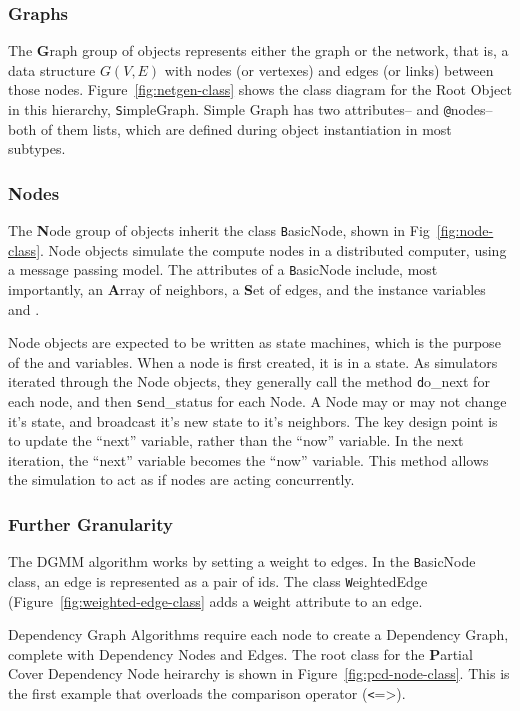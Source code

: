 \subsubsection{Graphs}

The {\textbf Graph} group of objects represents either the graph or the network, that is, a data structure $G(V,E)$ with nodes (or vertexes) and edges (or links) between those nodes. Figure~\ref{fig:netgen-class} shows the class diagram for the Root Object in this hierarchy, {\texttt SimpleGraph}. Simple Graph has two attributes--{\texttt \@edges} and {\texttt @nodes}--both of them lists, which are defined during object instantiation in most subtypes. 


\subsubsection{Nodes}
\label{sec:sim-objects-nodes}
The {\textbf Node} group of objects inherit the class {\texttt BasicNode}, shown in Fig~\ref{fig:node-class}. Node objects simulate the compute nodes in a distributed computer, using a message passing model. The attributes of a {\texttt BasicNode} include, most importantly, an {\textbf Array} of neighbors, a {\textbf Set} of edges, and the instance variables {\@next and \@now}.

Node objects are expected to be written as state machines, which is the purpose of the \@next and \@now variables. When a node is first created, it is in a state. As simulators iterated through the Node objects, they generally call the method {\texttt do\_next} for each node, and then {\texttt send\_status} for each Node. A Node may or may not change it's state, and broadcast it's new state to it's neighbors. The key design point is to update the ``next'' variable, rather than the ``now'' variable. In the next iteration, the ``next'' variable becomes the ``now'' variable. This method allows the simulation to act as if nodes are acting concurrently.

\subsubsection{Further Granularity}

The DGMM algorithm works by setting a weight to edges. In the {\texttt BasicNode} class, an edge is represented as a pair of ids. The class {\texttt WeightedEdge} (Figure~\ref{fig:weighted-edge-class} adds a {\texttt weight} attribute to an edge. 

Dependency Graph Algorithms require each node to create a Dependency Graph, complete with Dependency Nodes and Edges. The root class for the {\textbf Partial Cover Dependency Node} heirarchy is shown in Figure~\ref{fig:pcd-node-class}. This is the first example that overloads the comparison operator ({\texttt <=>}). 

